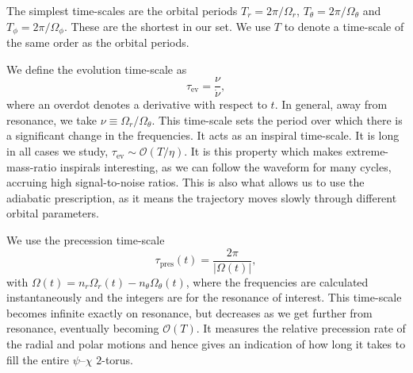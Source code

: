 \documentclass[aps,prd,amsfonts,amssymb,amsmath,nofootinbib,reprint,showpacs,superscriptaddress,twocolumn]{revtex4}
\newcommand{\sub}[1]{\ensuremath{_\text{#1}}}
\newcommand{\order}[1]{\ensuremath{\mathcal{O}({#1})}}
\begin{document}
The simplest time-scales are the orbital periods $T_r = 2\pi/\Omega_r$, $T_\theta = 2\pi/\Omega_\theta$ and $T_\phi = 2\pi/\Omega_\phi$. These are the shortest in our set. We use $T$ to denote a time-scale of the same order as the orbital periods.

We define the evolution time-scale as
\begin{equation}
\tau\sub{ev} = \frac{\nu}{\dot{\nu}},
\end{equation}
where an overdot denotes a derivative with respect to $t$. In general, away from resonance, we take $\nu \equiv \Omega_r/\Omega_\theta$. This time-scale sets the period over which there is a significant change in the frequencies. It acts as an inspiral time-scale. It is long in all cases we study, $\tau\sub{ev} \sim \order{T/\eta}$. It is this property which makes extreme-mass-ratio inspirals interesting, as we can follow the waveform for many cycles, accruing high signal-to-noise ratios. This is also what allows us to use the adiabatic prescription, as it means the trajectory moves slowly through different orbital parameters.

We use the precession time-scale
\begin{equation}
\tau\sub{pres}(t) = \frac{2\pi}{|\Omega(t)|},
\label{eq:t-pres}
\end{equation}
with $\Omega(t) = n_r \Omega_r(t) - n_\theta \Omega_\theta(t)$, where the frequencies are calculated instantaneously and the integers are for the resonance of interest. This time-scale becomes infinite exactly on resonance, but decreases as we get further from resonance, eventually becoming $\order{T}$. It measures the relative precession rate of the radial and polar motions and hence gives an indication of how long it takes to fill the entire $\psi$--$\chi$ $2$-torus.
\end{document}
